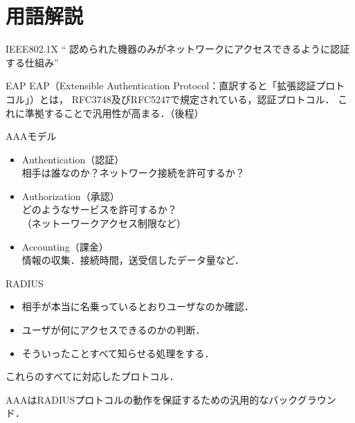\section{用語解説}
\begin{frame}[c]{\fft}
    \begin{block}{IEEE802.1X}
        `` 認められた機器のみがネットワークにアクセスできるように認証する仕組み''
    \end{block}
    \vfill
    \begin{block}{EAP}
        EAP（Extensible Authentication Protocol：直訳すると「拡張認証プロトコル」）とは，
        {{RFC3748}}及び{{RFC5247}}で規定されている，認証プロトコル．
        これに準拠することで汎用性が高まる．（後程）
    \end{block}
\end{frame}
\begin{frame}[c]{\fft}
    \begin{block}{AAAモデル}
        \begin{itemize}
            \item {\large A}uthentication（認証）\\
                  相手は誰なのか？ネットワーク接続を許可するか？
            \item {\large A}uthorization（承認）\\
                  どのようなサービスを許可するか？\\（ネットーワークアクセス制限など）
            \item {\large A}ccounting（課金）\\
                  情報の収集．接続時間，送受信したデータ量など．
        \end{itemize}
    \end{block}
\end{frame}
\begin{frame}[c]{\fft}
    \begin{block}{RADIUS}
        \begin{itemize}
            \item 相手が本当に名乗っているとおりユーザなのか確認．
            \item ユーザが何にアクセスできるのかの判断．
            \item そういったことすべて知らせる処理をする．
        \end{itemize}
        これらのすべてに対応したプロトコル．\par
        AAAはRADIUSプロトコルの動作を保証するための汎用的なバックグラウンド．
    \end{block}
\end{frame}
